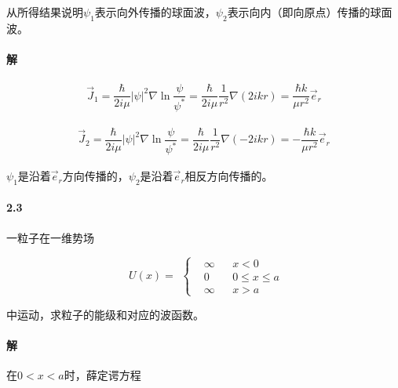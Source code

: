 \documentclass{article}
\newcommand*{\Jmath}{J}
\begin{document}
从所得结果说明$\psi_1$表示向外传播的球面波，$\psi_2$表示向内（即向原点）传播的球面波。

\paragraph{解}

\begin{equation*}
  \begin{aligned}
    \vec{\Jmath}_1 = \dfrac{\hbar}{2 i \mu} \left| \psi \right|^2  \nabla \ln \dfrac{\psi}{\psi^{*}} = \dfrac{\hbar}{2i\mu} \dfrac{1}{r^2} \nabla \left( 2ikr \right) = \dfrac{\hbar k}{\mu r^2} \vec{e}_r 
  \end{aligned}
\end{equation*}

\begin{equation*}
  \begin{aligned}
    \vec{\Jmath}_2 = \dfrac{\hbar}{2 i \mu} \left| \psi \right|^2  \nabla \ln \dfrac{\psi}{\psi^{*}} = \dfrac{\hbar}{2i\mu} \dfrac{1}{r^2} \nabla \left( -2ikr \right) = - \dfrac{\hbar k}{\mu r^2} \vec{e}_r 
  \end{aligned}
\end{equation*}

$\psi_1$是沿着$\vec{e}_r$方向传播的，$\psi_2$是沿着$\vec{e}_r$相反方向传播的。

\paragraph{2.3}

一粒子在一维势场

\begin{equation*}
  \begin{aligned}
    U \left( x \right) =
  \end{aligned}
  \left\{
  \begin{aligned}
    & \infty && x<0 \\
    & 0 && 0 \leq x \leq a \\
    & \infty && x>a
  \end{aligned}
  \right.
\end{equation*}

中运动，求粒子的能级和对应的波函数。

\paragraph{解}

在$0<x<a$时，薛定谔方程
\end{document}

